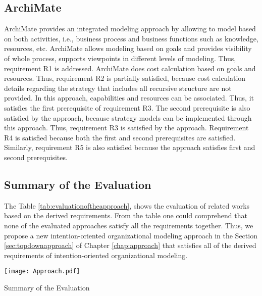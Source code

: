 \subsection{ArchiMate}
ArchiMate provides an integrated modeling approach by allowing to model based on both activities, i.e., business process and business functions such as knowledge, resources, etc. ArchiMate allows modeling based on goals and provides visibility of whole process, supports viewpoints in different levels of modeling. Thus, requirement R1 is addressed. ArchiMate does cost calculation based on goals and resources. Thus, requirement R2 is partially satisfied, because cost calculation details regarding the strategy that includes all recursive structure are not provided.  In this approach, capabilities and resources can be associated. Thus, it satisfies the first prerequisite of requirement R3. The second prerequisite is also satisfied by the approach, because strategy models can be implemented through this approach. Thus, requirement R3 is satisfied by the approach. Requirement R4 is satisfied because both the first and second prerequisites are satisfied. Similarly, requirement R5 is also satisfied because the approach satisfies first and second prerequisites.  

\subsection {Summary of the Evaluation}
 The Table \ref{tab:evaluationoftheapproach}, shows the evaluation of related works based on the derived requirements. From the table one could comprehend that none of the evaluated approaches satisfy all the requirements together. Thus, we propose a new intention-oriented organizational modeling approach in the Section \ref{sec:topdownapproach} of Chapter \ref{chap:approach} that satisfies all of the derived requirements of intention-oriented organizational modeling. 

 \begin{table}
 	\centering
 	\texttt{[image: Approach.pdf]}
 	\caption{Summary of the Evaluation}
 	\label{tab:evaluationoftheapproach}
 \end{table} 


